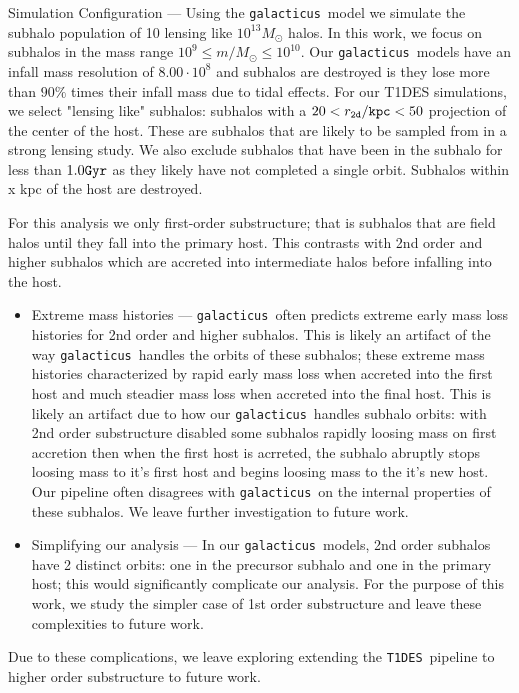 \documentclass[%
 reprint,
 amsmath,
 amssymb,
 aps,
]{revtex4-2}
\def\gal{{\tt galacticus}~}
\def\tides{{\tt T1DES}~}
\begin{document}
Simulation Configuration — Using the \gal model we simulate the subhalo population of 10 lensing like $10^{13} M_{\odot}$ halos.
In this work, we focus on subhalos in the mass range  $10^{9} \leq m / M_\odot \leq 10^{10}$.
Our \gal models have an infall mass resolution of $8.00 \cdot 10^{8}$ and subhalos are destroyed is they lose more than $90\%$ times their infall mass due to tidal effects.
For our T1DES simulations, we select "lensing like" subhalos: subhalos with a $20 < r_{\tt 2d} / {\tt kpc} < 50$ projection of the center of the host.
These are subhalos that are likely to be sampled from in a strong lensing study. We also exclude subhalos that have been in the subhalo for less than $1.0 {\tt Gyr}$ as they likely have not completed a single orbit. 
Subhalos within x kpc of the host are destroyed. 

For this analysis we only first-order substructure; that is subhalos that are field halos until they fall into the primary host. This contrasts with 2nd order and higher subhalos which are accreted into intermediate halos before infalling into the host.
\begin{itemize}    
    \item Extreme mass histories --- \gal often predicts extreme early mass loss histories for 2nd order and higher subhalos. This is likely an artifact of the way \gal handles the orbits of these subhalos; these extreme mass histories characterized by rapid early mass loss when accreted into the first host and much steadier mass loss when accreted into the final host. This is likely an artifact due to how our \gal handles subhalo orbits: with 2nd order substructure disabled some subhalos rapidly loosing mass on first accretion then when the first host is acrreted, the subhalo abruptly stops loosing mass to it's first host and begins loosing mass to the it's new host. Our pipeline often disagrees with \gal on the internal properties of these subhalos. We leave further investigation to future work. 
    \item Simplifying our analysis --- In our \gal models, 2nd order subhalos have 2 distinct orbits: one in the precursor subhalo and one in the primary host; this would significantly complicate our analysis. For the purpose of this work, we study the simpler case of 1st order substructure and leave these complexities to future work. 
\end{itemize}
Due to these complications, we leave exploring extending the \tides pipeline to higher order substructure to future work. 
\end{document}
